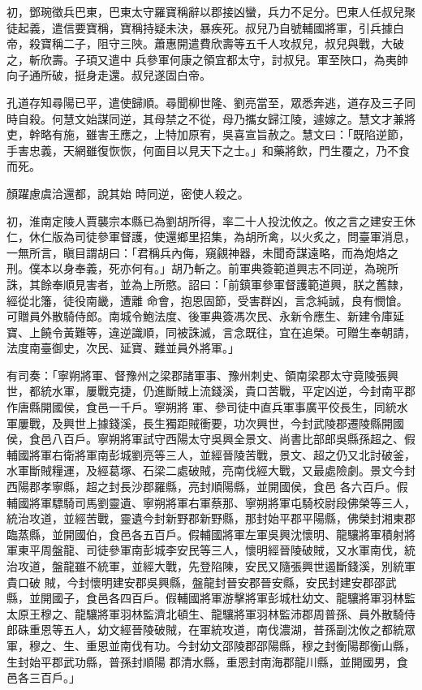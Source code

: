 \begin{pinyinscope}
 初，鄧琬徵兵巴東，巴東太守羅寶稱辭以郡接凶蠻，兵力不足分。巴東人任叔兒聚徒起義，遣信要寶稱，寶稱持疑未決，暴疾死。叔兒乃自號輔國將軍，引兵據白帝，殺寶稱二子，阻守三陜。蕭惠開遣費欣壽等五千人攻叔兒，叔兒與戰，大破之，斬欣壽。子頊又遣中
 兵參軍何康之領宜都太守，討叔兒。軍至陜口，為夷帥向子通所破，挺身走還。叔兒遂固白帝。



 孔道存知尋陽已平，遣使歸順。尋聞柳世隆、劉亮當至，眾悉奔逃，道存及三子同時自殺。何慧文始謀同逆，其母禁之不從，母乃攜女歸江陵，遽嫁之。慧文才兼將吏，幹略有施，雖害王應之，上特加原宥，吳喜宣旨赦之。慧文曰：「既陷逆節，手害忠義，天網雖復恢恢，何面目以見天下之士。」和藥將飲，門生覆之，乃不食而死。



 顏躍慮虞洽還都，說其始
 時同逆，密使人殺之。



 初，淮南定陵人賈襲宗本縣已為劉胡所得，率二十人投沈攸之。攸之言之建安王休仁，休仁版為司徒參軍督護，使還鄉里招集，為胡所禽，以火炙之，問臺軍消息，一無所言，瞋目謂胡曰：「君稱兵內侮，窺覦神器，未聞奇謀遠略，而為炮烙之刑。僕本以身奉義，死亦何有。」胡乃斬之。前軍典簽範道興志不同逆，為琬所誅，其餘奉順見害者，並為上所愍。詔曰：「前鎮軍參軍督護範道興，朕之舊隸，經從北籓，徒役南畿，遭離
 命會，抱恩固節，受害群凶，言念純誠，良有憫愴。可贈員外散騎侍郎。南城令鮑法度、後軍典簽馮次民、永新令應生、新建令庫延寶、上饒令黃難等，違逆識順，同被誅滅，言念既往，宜在追榮。可贈生奉朝請，法度南臺御史，次民、延寶、難並員外將軍。」



 有司奏：「寧朔將軍、督豫州之梁郡諸軍事、豫州刺史、領南梁郡太守竟陵張興世，都統水軍，屢戰克捷，仍進斷賊上流錢溪，貴口苦戰，平定凶逆，今封南平郡作唐縣開國侯，食邑一千戶。寧朔將
 軍、參司徒中直兵軍事廣平佼長生，同統水軍屢戰，及興世上據錢溪，長生獨距賊衝要，功次興世，今封武陵郡遷陵縣開國侯，食邑八百戶。寧朔將軍試守西陽太守吳興全景文、尚書比部郎吳縣孫超之、假輔國將軍右衛將軍南彭城劉亮等三人，並經晉陵苦戰，景文、超之仍又北討破釜，水軍斷賊糧運，及經葛塚、石梁二處破賊，亮南伐經大戰，又最處險劇。景文今封西陽郡孝寧縣，超之封長沙郡羅縣，亮封順陽縣，並開國侯，食邑
 各六百戶。假輔國將軍驃騎司馬劉靈遺、寧朔將軍右軍蔡那、寧朔將軍屯騎校尉段佛榮等三人，統治攻道，並經苦戰，靈遺今封新野郡新野縣，那封始平郡平陽縣，佛榮封湘東郡臨蒸縣，並開國伯，食邑各五百戶。假輔國將軍左軍吳興沈懷明、龍驤將軍積射將軍東平周盤龍、司徒參軍南彭城李安民等三人，懷明經晉陵破賊，又水軍南伐，統治攻道，盤龍雖不統軍，並經大戰，先登陷陳，安民又隨張興世遏斷錢溪，別統軍貴口破
 賊，今封懷明建安郡吳興縣，盤龍封晉安郡晉安縣，安民封建安郡邵武縣，並開國子，食邑各四百戶。假輔國將軍游擊將軍彭城杜幼文、龍驤將軍羽林監太原王穆之、龍驤將軍羽林監濟北頓生、龍驤將軍羽林監沛郡周普孫、員外散騎侍郎硃重恩等五人，幼文經晉陵破賊，在軍統攻道，南伐濃湖，普孫副沈攸之都統眾軍，穆之、生、重恩並南伐有功。今封幼文邵陵郡邵陽縣，穆之封衡陽郡衡山縣，生封始平郡武功縣，普孫封順陽
 郡清水縣，重恩封南海郡龍川縣，並開國男，食邑各三百戶。」




\end{pinyinscope}
